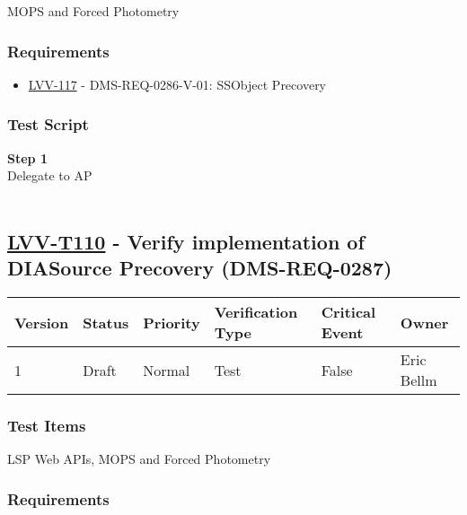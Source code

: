 MOPS and Forced Photometry

\hypertarget{requirements-86}{%
\subsubsection{Requirements}\label{requirements-86}}

\begin{itemize}
\tightlist
\item
  \href{https://jira.lsstcorp.org/browse/LVV-117}{LVV-117} -
  DMS-REQ-0286-V-01: SSObject Precovery
\end{itemize}

\hypertarget{test-script-86}{%
\subsubsection{Test Script}\label{test-script-86}}

\textbf{Step 1}\\
Delegate to AP\\
~\\

\hypertarget{lvv-t110---verify-implementation-of-diasource-precovery-dms-req-0287}{%
\subsection{\texorpdfstring{\href{https://jira.lsstcorp.org/secure/Tests.jspa\#/testCase/LVV-T110}{LVV-T110}
- Verify implementation of DIASource Precovery
(DMS-REQ-0287)}{LVV-T110 - Verify implementation of DIASource Precovery (DMS-REQ-0287)}}\label{lvv-t110---verify-implementation-of-diasource-precovery-dms-req-0287}}

\begin{longtable}[]{@{}llllll@{}}
\toprule
Version & Status & Priority & Verification Type & Critical Event &
Owner\tabularnewline
\midrule
\endhead
1 & Draft & Normal & Test & False & Eric Bellm\tabularnewline
\bottomrule
\end{longtable}

\hypertarget{test-items-86}{%
\subsubsection{Test Items}\label{test-items-86}}

LSP Web APIs, MOPS and Forced Photometry~

\hypertarget{requirements-87}{%
\subsubsection{Requirements}\label{requirements-87}}

